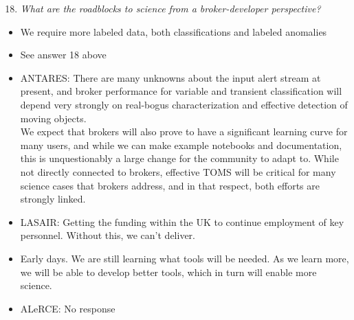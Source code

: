 \documentclass{article}
\begin{document}
\begin{enumerate}
\setcounter{enumi}{17}
\item {\em What are the roadblocks to science from a broker-developer perspective?}
\end{enumerate}

\begin{itemize}
\item We require more labeled data, both classifications and labeled anomalies
\item See answer 18 above
\item ANTARES: There are many unknowns about the input alert stream at present, and broker performance for variable and transient classification will depend very strongly on real-bogus characterization and effective detection of moving objects. \\
We expect that brokers will also prove to have a significant learning curve for many users, and while we can make example notebooks and documentation, this is unquestionably a large change for the community to adapt to.  While not directly connected to brokers, effective TOMS will be critical for many science cases that brokers address, and in that respect, both efforts are strongly linked. 
\item LASAIR: Getting the funding within the UK to continue employment of key personnel. Without this, we can't deliver. 
\item Early days. We are still learning what tools will be needed. As we learn more, we will be able to develop better tools, which in turn will enable more science.
\item ALeRCE: No response
\end{itemize}

\section{}
\label{sec:references}

\end{document}

